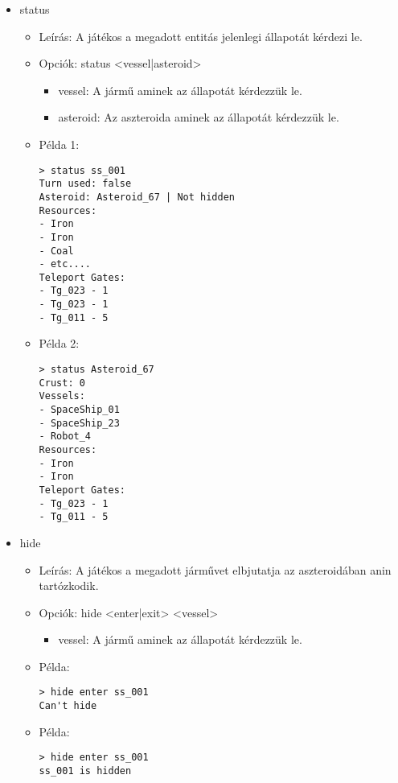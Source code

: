 \documentclass[../../projlab]{subfiles}
\begin{document}
\begin{itemize}
    \item status
    \begin{itemize}
        \item Leírás: A játékos a megadott entitás jelenlegi állapotát kérdezi le.
        \item Opciók: status <vessel|asteroid>
        \begin{itemize}
            \item vessel: A jármű aminek az állapotát kérdezzük le.
            \item asteroid: Az aszteroida aminek az állapotát kérdezzük le.
        \end{itemize}
        \item Példa 1:
            \begin{verbatim}
> status ss_001
Turn used: false
Asteroid: Asteroid_67 | Not hidden
Resources:
- Iron
- Iron
- Coal
- etc....
Teleport Gates:
- Tg_023 - 1
- Tg_023 - 1
- Tg_011 - 5
            \end{verbatim}
        \item Példa 2:
            \begin{verbatim}
> status Asteroid_67
Crust: 0
Vessels:
- SpaceShip_01
- SpaceShip_23
- Robot_4
Resources:
- Iron
- Iron
Teleport Gates:
- Tg_023 - 1
- Tg_011 - 5
            \end{verbatim}        
    \end{itemize}


    \item hide
    \begin{itemize}
        \item Leírás: A játékos a megadott járművet elbjutatja az aszteroidában anin tartózkodik.
        \item Opciók: hide <enter|exit> <vessel>
        \begin{itemize}
            \item vessel: A jármű aminek az állapotát kérdezzük le.
        \end{itemize}
        \item Példa:
            \begin{verbatim}
> hide enter ss_001
Can't hide
            \end{verbatim}
        \item Példa:
            \begin{verbatim}
> hide enter ss_001
ss_001 is hidden
            \end{verbatim}            
    \end{itemize}



\end{itemize}
\end{document}
